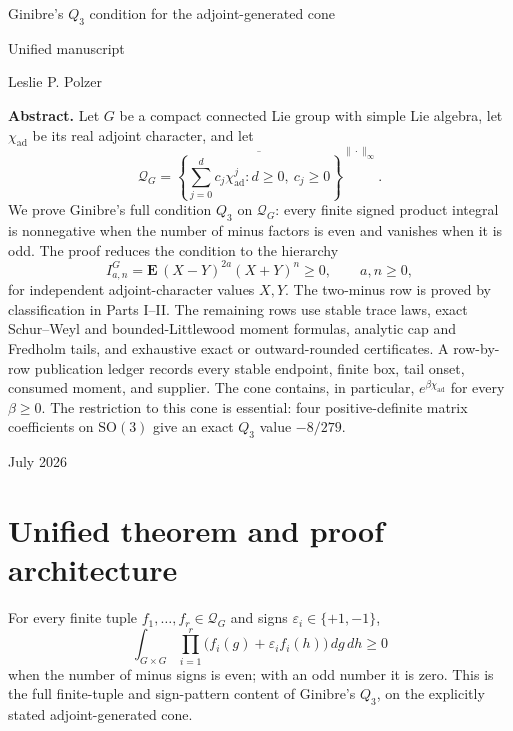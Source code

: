 \documentclass[11pt]{article}
\newcommand{\chiad}{\chi_{\mathrm{ad}}}
\newcommand{\Qcone}{\mathcal Q}
\begin{document}
\begin{titlepage}
\centering
{\LARGE Ginibre's $Q_3$ condition for the adjoint-generated cone\par}
\vspace{1.2em}
{\Large Unified manuscript\par}
\vspace{2em}
{\large Leslie P. Polzer\par}
\vspace{2.5em}
\begin{minipage}{0.88\textwidth}
\small
\textbf{Abstract.}
Let $G$ be a compact connected Lie group with simple Lie algebra, let
$\chiad$ be its real adjoint character, and let
\[
 \Qcone_G=\overline{\left\{\sum_{j=0}^dc_j\chiad^j:
 d\geq0,\ c_j\geq0\right\}}^{\|\cdot\|_\infty}.
\]
We prove Ginibre's full condition $Q_3$ on $\Qcone_G$: every finite signed
product integral is nonnegative when the number of minus factors is even and
vanishes when it is odd.  The proof reduces the condition to the hierarchy
\[
 I^G_{a,n}=\mathbf E\,(X-Y)^{2a}(X+Y)^n\geq0,
 \qquad a,n\geq0,
\]
for independent adjoint-character values $X,Y$.  The two-minus row is proved
by classification in Parts I--II.  The remaining rows use stable trace laws,
exact Schur--Weyl and bounded-Littlewood moment formulas, analytic cap and
Fredholm tails, and exhaustive exact or outward-rounded certificates.  A
row-by-row publication ledger records every stable endpoint, finite box, tail
onset, consumed moment, and supplier.  The cone contains, in particular,
$e^{\beta\chiad}$ for every $\beta\geq0$.  The restriction to this cone is
essential: four positive-definite matrix coefficients on $\mathrm{SO}(3)$
give an exact $Q_3$ value $-8/279$.
\end{minipage}
\vfill
{\large July 2026\par}
\end{titlepage}

\section*{Unified theorem and proof architecture}

For every finite tuple $f_1,\ldots,f_r\in\Qcone_G$ and signs
$\varepsilon_i\in\{+1,-1\}$,
\[
 \int_{G\times G}\prod_{i=1}^r
 \bigl(f_i(g)+\varepsilon_i f_i(h)\bigr)\,dg\,dh\geq0
\]
when the number of minus signs is even; with an odd number it is zero.  This
is the full finite-tuple and sign-pattern content of Ginibre's $Q_3$, on the
explicitly stated adjoint-generated cone.
\end{document}
